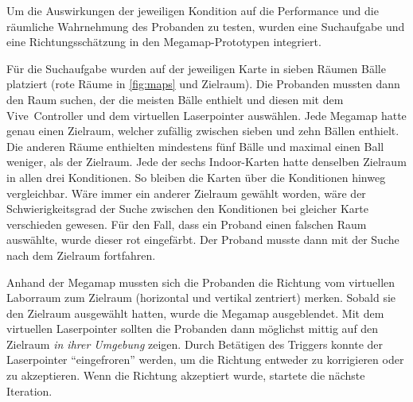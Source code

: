 Um die Auswirkungen der jeweiligen Kondition auf die Performance und die räumliche Wahrnehmung des Probanden zu testen, wurden eine Suchaufgabe und eine Richtungsschätzung in den Megamap-Prototypen integriert.

Für die Suchaufgabe wurden auf der jeweiligen Karte in sieben Räumen Bälle platziert (rote Räume in \autoref{fig:maps} und Zielraum).
Die Probanden mussten dann den Raum suchen, der die meisten Bälle enthielt und diesen mit dem Vive~Controller und dem virtuellen Laserpointer auswählen.
Jede Megamap hatte genau einen Zielraum, welcher zufällig zwischen sieben und zehn Bällen enthielt.
Die anderen Räume enthielten mindestens fünf Bälle und maximal einen Ball weniger, als der Zielraum.
Jede der sechs Indoor-Karten hatte denselben Zielraum in allen drei Konditionen.
So bleiben die Karten über die Konditionen hinweg vergleichbar.
Wäre immer ein anderer Zielraum gewählt worden, wäre der Schwierigkeitsgrad der Suche zwischen den Konditionen bei gleicher Karte verschieden gewesen.
Für den Fall, dass ein Proband einen falschen Raum auswählte, wurde dieser rot eingefärbt.
Der Proband musste dann mit der Suche nach dem Zielraum fortfahren.

Anhand der Megamap mussten sich die Probanden die Richtung vom virtuellen Laborraum zum Zielraum (horizontal und vertikal zentriert) merken.
Sobald sie den Zielraum ausgewählt hatten, wurde die Megamap ausgeblendet.
Mit dem virtuellen Laserpointer sollten die Probanden dann möglichst mittig auf den Zielraum \emph{in ihrer Umgebung} zeigen.
Durch Betätigen des Triggers konnte der Laserpointer \enquote{eingefroren} werden, um die Richtung entweder zu korrigieren oder zu akzeptieren.
Wenn die Richtung akzeptiert wurde, startete die nächste Iteration.

